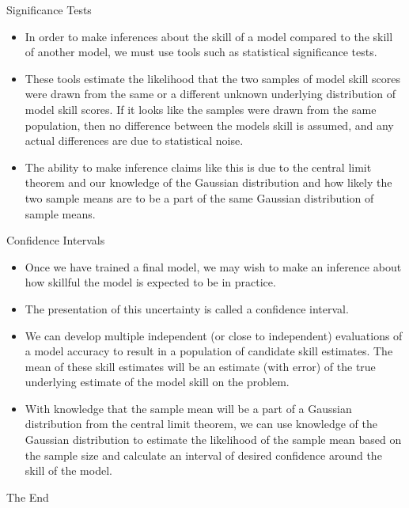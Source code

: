 \documentclass{beamer}
\begin{document}
\begin{frame}{Significance Tests}
	\begin{itemize}
		\item In order to make inferences about the skill of a model compared to the skill of another model, we must use tools such as statistical significance tests.
		\item These tools estimate the likelihood that the two samples of model skill scores were drawn from the same or a different unknown underlying distribution of model skill scores. If it looks like the samples were drawn from the same population, then no difference between the models skill is assumed, and any actual differences are due to statistical noise.
		\item The ability to make inference claims like this is due to the central limit theorem and our knowledge of the Gaussian distribution and how likely the two sample means are to be a part of the same Gaussian distribution of sample means.
	\end{itemize}
\end{frame}
\begin{frame}{Confidence Intervals}
	\begin{itemize}
		\item Once we have trained a final model, we may wish to make an inference about how skillful the model is expected to be in practice.
		\item The presentation of this uncertainty is called a confidence interval.
		\item We can develop multiple independent (or close to independent) evaluations of a model accuracy to result in a population of candidate skill estimates. The mean of these skill estimates will be an estimate (with error) of the true underlying estimate of the model skill on the problem.
		\item With knowledge that the sample mean will be a part of a Gaussian distribution from the central limit theorem, we can use knowledge of the Gaussian distribution to estimate the likelihood of the sample mean based on the sample size and calculate an interval of desired confidence around the skill of the model.
	\end{itemize}
\end{frame}

\begin{frame}
\huge{\centerline{The End}}
\end{frame}
\end{document}
